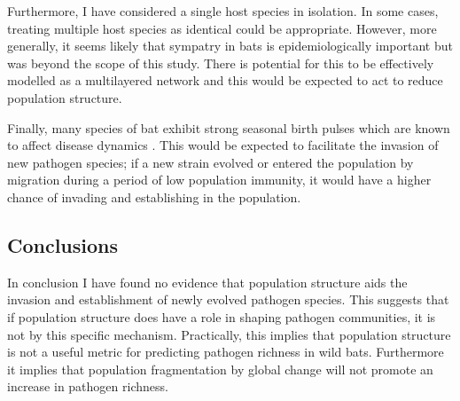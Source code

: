 Furthermore, I have considered a single host species in isolation.
In some cases, treating multiple host species as identical could be appropriate.
However, more generally, it seems likely that sympatry in bats is epidemiologically important \cite{brierley2016quantifying, luis2013comparison} but was beyond the scope of this study.
There is potential for this to be effectively modelled as a multilayered network \cite{wang2016structural, funk2010interacting} and this would be expected to act to reduce population structure.

Finally, many species of bat exhibit strong seasonal birth pulses which are known to affect disease dynamics \cite{hayman2015biannual,peel2014effect,amman2012seasonal}.
This would be expected to facilitate the invasion of new pathogen species; if a new strain evolved or entered the population by migration during a period of low population immunity, it would have a higher chance of invading and establishing in the population.

\subsection{Conclusions}

In conclusion I have found no evidence that population structure aids the invasion and establishment of newly evolved pathogen species.
This suggests that if population structure does have a role in shaping pathogen communities, it is not by this specific mechanism.
Practically, this implies that population structure is not a useful metric for predicting pathogen richness in wild bats.
Furthermore it implies that population fragmentation by global change will not promote an increase in pathogen richness.





